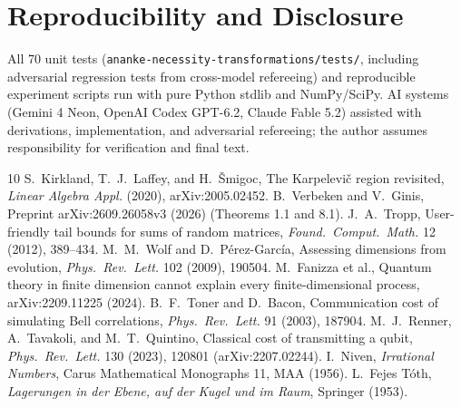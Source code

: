 \documentclass[11pt]{article}
\theoremstyle{definition}
\begin{document}
\section*{Reproducibility and Disclosure}
All 70 unit tests (\texttt{ananke-necessity-transformations/tests/}, including adversarial regression tests from cross-model refereeing) and reproducible experiment scripts run with pure Python stdlib and NumPy/SciPy. AI systems (Gemini 4 Neon, OpenAI Codex GPT-6.2, Claude Fable 5.2) assisted with derivations, implementation, and adversarial refereeing; the author assumes responsibility for verification and final text.

\begin{thebibliography}{10}
 S.~Kirkland, T.~J.~Laffey, and H.~\v{S}migoc, The Karpelevi\v{c} region revisited, \emph{Linear Algebra Appl.} (2020), arXiv:2005.02452.
 B.~Verbeken and V.~Ginis, Preprint arXiv:2609.26058v3 (2026) (Theorems 1.1 and 8.1).
 J.~A.~Tropp, User-friendly tail bounds for sums of random matrices, \emph{Found.\ Comput.\ Math.} 12 (2012), 389--434.
 M.~M.~Wolf and D.~P\'erez-Garc\'ia, Assessing dimensions from evolution, \emph{Phys.\ Rev.\ Lett.} 102 (2009), 190504.
 M.~Fanizza et al., Quantum theory in finite dimension cannot explain every finite-dimensional process, arXiv:2209.11225 (2024).
 B.~F.~Toner and D.~Bacon, Communication cost of simulating Bell correlations, \emph{Phys.\ Rev.\ Lett.} 91 (2003), 187904.
 M.~J.~Renner, A.~Tavakoli, and M.~T.~Quintino, Classical cost of transmitting a qubit, \emph{Phys.\ Rev.\ Lett.} 130 (2023), 120801 (arXiv:2207.02244).
 I.~Niven, \emph{Irrational Numbers}, Carus Mathematical Monographs 11, MAA (1956).
 L.~Fejes T\'oth, \emph{Lagerungen in der Ebene, auf der Kugel und im Raum}, Springer (1953).
\end{thebibliography}
\end{document}
